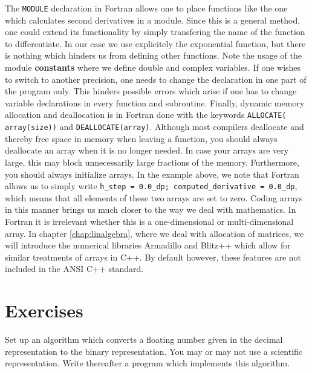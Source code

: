 The \verb?MODULE? declaration in Fortran allows one to place functions
like the one which calculates second derivatives in a module. Since this is a general method,
one could extend its functionality by simply transfering 
the name of the function to differentiate. In our case we use explicitely the exponential
function, but there is nothing which hinders us from defining other functions. 
Note the usage of the module {\bf constants} where we define double and complex variables.
If one wishes to switch to another precision, one needs to change the declaration
in one part of the program only. This hinders possible errors which arise if one has to change
variable declarations in every function and subroutine.   
Finally, dynamic memory allocation and deallocation is in Fortran 
done with the keywords \verb?ALLOCATE( array(size))? and \verb?DEALLOCATE(array)?.
Although most compilers deallocate and thereby free space in memory when leaving a
function, you should always deallocate an array when it is no longer needed. In case your arrays
are very large, this may block unnecessarily large fractions of the memory. 
Furthermore, you should always initialize arrays. In the example above, we note that Fortran allows
us to simply write \verb?h_step = 0.0_dp; computed_derivative = 0.0_dp?, which means that all
elements of these two arrays are set to zero.  Coding arrays in this manner brings us much
closer to the way we deal with mathematics. 
In Fortran  it is irrelevant whether this is a one-dimensional or multi-dimensional array.
In chapter \ref{chap:linalgebra}, where we deal with
allocation of matrices, we will introduce the  numerical libraries Armadillo and 
Blitz++ which allow for similar
treatments of arrays in C++. By default however, these features are not included in 
the ANSI C++ standard. 







\section{Exercises}

\begin{prob}
Set up an algorithm
which converts a floating number given in the decimal representation 
to the binary representation. You may or may not use a scientific representation.
Write thereafter a program which implements this algorithm. 
\end{prob}


